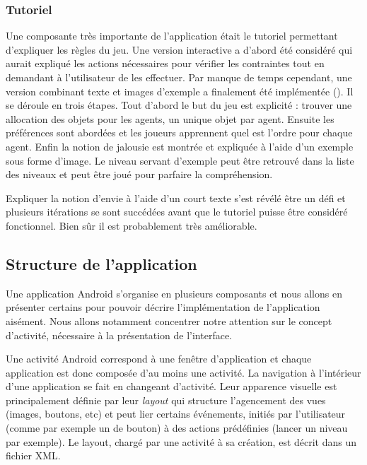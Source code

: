 \documentclass[../main.tex]{subfiles}
\begin{document}
    \subsubsection{Tutoriel}
    
    Une composante très importante de l'application était le tutoriel permettant d'expliquer les règles du jeu. Une version interactive a d'abord été considéré qui aurait expliqué les actions nécessaires pour vérifier les contraintes tout en demandant à l'utilisateur de les effectuer. Par manque de temps cependant, une version combinant texte et images d'exemple a finalement été implémentée (). Il se déroule en trois étapes. Tout d'abord le but du jeu est explicité : trouver une allocation des objets pour les agents, un unique objet par agent. Ensuite les préférences sont abordées et les joueurs apprennent quel est l'ordre pour chaque agent. Enfin la notion de jalousie est montrée et expliquée à l'aide d'un exemple sous forme d'image. Le niveau servant d'exemple peut être retrouvé dans la liste des niveaux et peut être joué pour parfaire la compréhension. 
    
    Expliquer la notion d'envie à l'aide d'un court texte s'est révélé être un défi et plusieurs itérations se sont succédées avant que le tutoriel puisse être  considéré fonctionnel. Bien sûr il est probablement très améliorable.

	\subsection{Structure de l'application}
	\label{sec-struct}
	Une application Android s'organise en plusieurs composants et nous allons en présenter certains pour pouvoir décrire l'implémentation de l'application aisément. Nous allons notamment concentrer notre attention sur le concept d'activité, nécessaire à la présentation de l'interface.
	
	Une activité Android correspond à une fenêtre d'application et chaque application est donc composée d'au moins une activité. La navigation à l'intérieur d'une application se fait en changeant d'activité. Leur apparence visuelle est principalement définie par leur \textit{layout} qui structure l'agencement des vues (images, boutons, etc) et peut lier certains événements, initiés par l'utilisateur (comme par exemple un  de bouton) à des actions prédéfinies (lancer un niveau par exemple). Le layout, chargé par une activité à sa création, est décrit dans un fichier XML.
	
\end{document}
